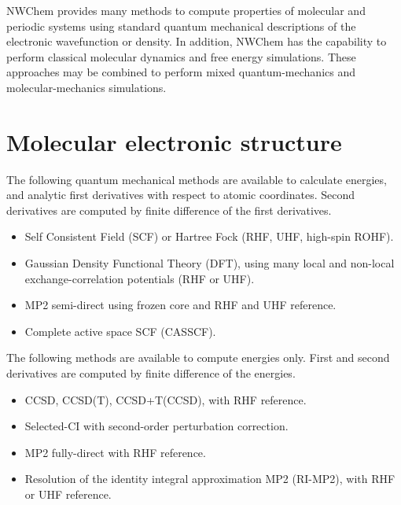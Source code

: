 \label{sec:functionality}

NWChem provides many methods to compute properties of molecular and
periodic systems using standard quantum mechanical descriptions of the
electronic wavefunction or density.  In addition, NWChem has the
capability to perform classical molecular dynamics and free energy
simulations.  These approaches may be combined to perform mixed
quantum-mechanics and molecular-mechanics simulations. 

\section{Molecular electronic structure}

The following quantum mechanical methods are available to calculate
energies, and analytic first derivatives with respect to atomic
coordinates.  Second derivatives are computed by finite difference of
the first derivatives.

\begin{itemize}
\item Self Consistent Field (SCF) or Hartree Fock (RHF, UHF, high-spin
  ROHF).  
\item Gaussian Density Functional Theory (DFT), using many local and
  non-local exchange-correlation potentials (RHF or UHF).
\item MP2 semi-direct using frozen core and RHF and UHF reference.

\item Complete active space SCF (CASSCF).

\end{itemize}

The following methods are available to compute energies only.  First
and second derivatives are computed by finite difference of the
energies.
\begin{itemize}
\item CCSD, CCSD(T), CCSD+T(CCSD), with RHF reference.
\item Selected-CI with second-order perturbation correction.
\item MP2 fully-direct with RHF reference.
\item Resolution of the identity integral approximation MP2 (RI-MP2), with
  RHF or UHF reference.
\end{itemize}

